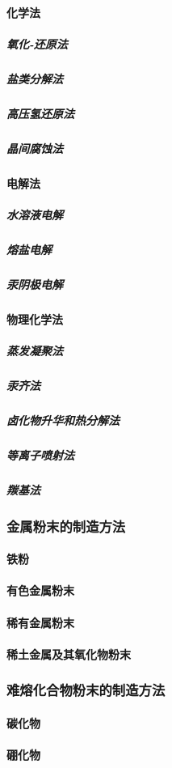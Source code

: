 \documentclass[UTF8]{../../ApplicationUniverse}
\begin{document}
            \paragraph{化学法}
                \subparagraph{氧化-还原法}
                \subparagraph{盐类分解法}
                \subparagraph{高压氢还原法}
                \subparagraph{晶间腐蚀法}
            \paragraph{电解法}
                \subparagraph{水溶液电解}
                \subparagraph{熔盐电解}
                \subparagraph{汞阴极电解}
            \paragraph{物理化学法}
                \subparagraph{蒸发凝聚法}
                \subparagraph{汞齐法}
                \subparagraph{卤化物升华和热分解法}
                \subparagraph{等离子喷射法}
                \subparagraph{羰基法}
        \subsubsection{金属粉末的制造方法}
            \paragraph{铁粉}
            \paragraph{有色金属粉末}
            \paragraph{稀有金属粉末}
            \paragraph{稀土金属及其氧化物粉末}
        \subsubsection{难熔化合物粉末的制造方法}
            \paragraph{碳化物}
            \paragraph{硼化物}
\end{document}
